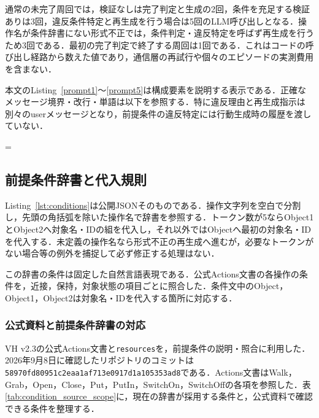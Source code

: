 通常の未完了周回では，検証なしは完了判定と生成の2回，条件を充足する検証ありは3回，違反条件特定と再生成を行う場合は5回のLLM呼び出しとなる．操作名が条件辞書にない形式不正では，条件判定・違反特定を呼ばず再生成を行うため3回である．最初の完了判定で終了する周回は1回である．これはコードの呼び出し経路から数えた値であり，通信層の再試行や個々のエピソードの実測費用を含まない．

本文のListing~\ref{prompt1}～\ref{prompt5}は構成要素を説明する表示である．正確なメッセージ境界・改行・単語は以下を参照する．特に違反理由と再生成指示は別々のuserメッセージとなり，前提条件の違反特定には行動生成時の履歴を渡していない．

\capwidth=\linewidth


\subsection{前提条件辞書と代入規則}\label{app:conditions}
Listing~\ref{lst:conditions}は公開JSONそのものである．操作文字列を空白で分割し，先頭の角括弧を除いた操作名で辞書を参照する．トークン数が5ならObject1とObject2へ対象名・IDの組を代入し，それ以外ではObjectへ最初の対象名・IDを代入する．未定義の操作名なら形式不正の再生成へ進むが，必要なトークンがない場合等の例外を捕捉して必ず修正する処理はない．

この辞書の条件は固定した自然言語表現である．公式Actions文書の各操作の条件を，近接，保持，対象状態の項目ごとに照合した．条件文中のObject，Object1，Object2は対象名・IDを代入する箇所に対応する．



\subsubsection{公式資料と前提条件辞書の対応}
VH v2.3の公式Actions文書と\texttt{resources}を，前提条件の説明・照合に利用した．2026年9月8日に確認したリポジトリのコミットは\texttt{58970fd80951c2eaa1af713e0917d1a105353ad8}である．Actions文書はWalk，Grab，Open，Close，Put，PutIn，SwitchOn，SwitchOffの各項を参照した．表\ref{tab:condition_source_scope}に，現在の辞書が採用する条件と，公式資料で確認できる条件を整理する．

